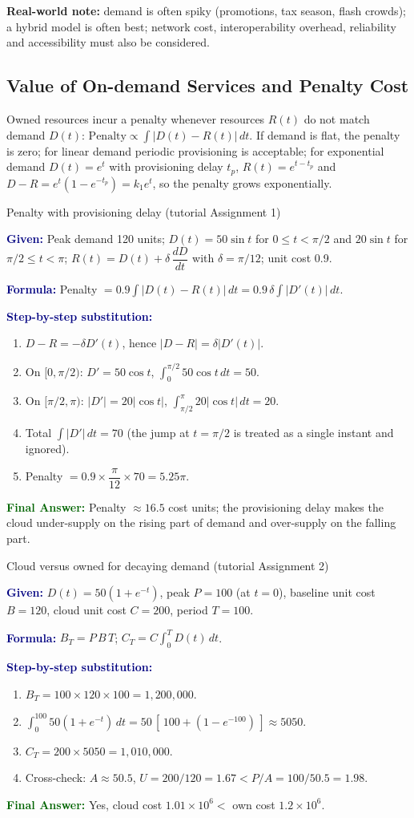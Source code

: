 \documentclass[11pt,a4paper,openany]{report}
\newcommand{\Given}{\par\textbf{\textcolor{navy}{Given:}} }
\newcommand{\Formula}{\par\textbf{\textcolor{navy}{Formula:}} }
\newcommand{\Steps}{\par\textbf{\textcolor{navy}{Step-by-step substitution:}}\par}
\newcommand{\Answer}{\par\textbf{\textcolor{darkgreen}{Final Answer:}} }
\begin{document}
\textbf{Real-world note:} demand is often spiky (promotions, tax season, flash crowds); a hybrid model is often best; network
cost, interoperability overhead, reliability and accessibility must also be considered.

\subsection{Value of On-demand Services and Penalty Cost}
Owned resources incur a penalty whenever resources $R(t)$ do not match demand $D(t)$:
$\text{Penalty} \propto \int |D(t) - R(t)|\,dt$. If demand is flat, the penalty is zero; for linear demand periodic provisioning is
acceptable; for exponential demand $D(t) = e^t$ with provisioning delay $t_p$, $R(t) = e^{t-t_p}$ and
$D - R = e^t(1 - e^{-t_p}) = k_1 e^t$, so the penalty grows exponentially.

\begin{solved}{Penalty with provisioning delay (tutorial Assignment 1)}
\Given Peak demand 120 units; $D(t) = 50\sin t$ for $0 \le t < \pi/2$ and $20\sin t$ for $\pi/2 \le t < \pi$;
$R(t) = D(t) + \delta\,\dfrac{dD}{dt}$ with $\delta = \pi/12$; unit cost 0.9.
\Formula Penalty $= 0.9 \int |D(t) - R(t)|\,dt = 0.9\,\delta \int |D'(t)|\,dt$.
\Steps
\begin{enumerate}[leftmargin=*]
  \item $D - R = -\delta D'(t)$, hence $|D - R| = \delta |D'(t)|$.
  \item On $[0,\pi/2)$: $D' = 50\cos t$, $\int_0^{\pi/2} 50\cos t\,dt = 50$.
  \item On $[\pi/2,\pi)$: $|D'| = 20|\cos t|$, $\int_{\pi/2}^{\pi} 20|\cos t|\,dt = 20$.
  \item Total $\int |D'|\,dt = 70$ (the jump at $t=\pi/2$ is treated as a single instant and ignored).
  \item Penalty $= 0.9 \times \dfrac{\pi}{12} \times 70 = 5.25\pi$.
\end{enumerate}
\Answer Penalty $\approx 16.5$ cost units; the provisioning delay makes the cloud under-supply on the rising part of demand and
over-supply on the falling part.
\end{solved}

\begin{solved}{Cloud versus owned for decaying demand (tutorial Assignment 2)}
\Given $D(t) = 50(1 + e^{-t})$, peak $P=100$ (at $t=0$), baseline unit cost $B = 120$, cloud unit cost $C = 200$, period $T = 100$.
\Formula $B_T = P\,B\,T$; $C_T = C\int_0^T D(t)\,dt$.
\Steps
\begin{enumerate}[leftmargin=*]
  \item $B_T = 100 \times 120 \times 100 = 1{,}200{,}000$.
  \item $\int_0^{100} 50(1 + e^{-t})\,dt = 50\,[\,100 + (1 - e^{-100})\,] \approx 5050$.
  \item $C_T = 200 \times 5050 = 1{,}010{,}000$.
  \item Cross-check: $A \approx 50.5$, $U = 200/120 = 1.67 < P/A = 100/50.5 = 1.98$.
\end{enumerate}
\Answer Yes, cloud cost $1.01\times10^6 <$ own cost $1.2\times10^6$.
\end{solved}
\end{document}
